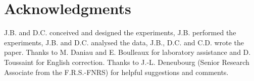 
\section{Acknowledgments}
J.B. and D.C. conceived and designed the experiments, J.B. performed the experiments, J.B. and D.C. analysed the data, J.B., D.C. and C.D. wrote the paper. Thanks to M. Daniau and E. Boulleaux for laboratory assistance and D. Toussaint for English correction. Thanks to J.-L. Deneubourg (Senior Research Associate from the F.R.S.-FNRS) for helpful suggestions and comments.


\clearpage




